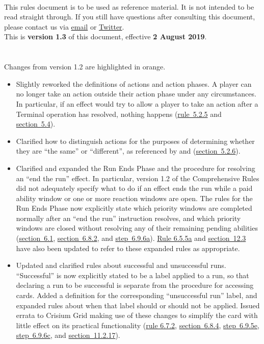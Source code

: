 \newcommand{\HRule}{\rule{\linewidth}{0.2mm}} %

\begin{titlepage}
\\[10pt]
This rules document is to be used as reference material. It is not intended to be read straight through. If you still have questions after consulting this document, please contact us via \href{mailto:rules@nisei.net}{email} or \href{https://twitter.com/NISEI_Rules}{Twitter}.\\[10pt]
This is \textbf{version 1.3} of this document, effective \textbf{2 August 2019}.\\\\
\\[10pt]
Changes from version 1.2 are \textcolor{Bittersweet}{highlighted in orange}.
\begin{itemize}
	\item Slightly reworked the definitions of actions and action phases. A player can no longer take an action outside their action phase under any circumstances. In particular, if an effect would try to allow a player	to take an action after a Terminal operation has resolved, nothing happens (\hyperlink{page.i}{rule~5.2.5} and \hyperlink{page.i}{section~5.4}).
	\item Clarified how to distinguish actions for the purposes of determining whether they are ``the same'' or ``different'', as referenced by  and  (\hyperlink{page.i}{section~5.2.6}).
	\item Clarified and expanded the Run Ends Phase and the procedure for resolving an ``end the run'' effect. In	particular, version 1.2 of the Comprehensive Rules did not adequately specify what to do if an effect
	ends the run while a paid ability window or one or more reaction windows are open. The rules for the Run Ends Phase now explicitly state which priority windows are completed normally after an ``end the run'' instruction resolves, and which priority windows are closed without resolving any of their remaining pending abilities (\hyperlink{page.i}{section~6.1}, \hyperlink{page.i}{section~6.8.2}, and \hyperlink{page.i}{step~6.9.6a}). \hyperlink{page.i}{Rule 6.5.5a} and \hyperlink{page.i}{section~12.3} have also been updated to refer to these expanded rules as appropriate.
	\item Updated and clarified rules about successful and unsuccessful runs. ``Successful'' is now explicitly stated to be a label applied to a run, so that declaring a run to be successful is separate from the procedure for accessing cards. Added a definition for the corresponding ``unsuccessful run'' label, and	expanded rules about when that label should or should not be applied. Issued errata to Crisium Grid	making use of these changes to simplify the card with little effect on its practical functionality (\hyperlink{page.i}{rule 6.7.2}, \hyperlink{page.i}{section~6.8.4}, \hyperlink{page.i}{step~6.9.5e}, \hyperlink{page.i}{step~6.9.6c}, and \hyperlink{page.i}{section~11.2.17}).

\end{itemize}
\end{titlepage}
